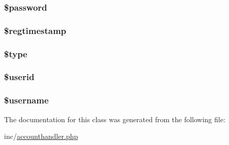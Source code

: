 \hypertarget{class_u_e4_a_m___account_a607686ef9f99ea7c42f4f3dd3dbb2b0d}{
\subsubsection[{\$password}]{\setlength{\rightskip}{0pt plus 5cm}\$password}}\label{class_u_e4_a_m___account_a607686ef9f99ea7c42f4f3dd3dbb2b0d}
\hypertarget{class_u_e4_a_m___account_a0d54b0cb14edcb0bb347eec01a221525}{
\subsubsection[{\$regtimestamp}]{\setlength{\rightskip}{0pt plus 5cm}\$regtimestamp}}\label{class_u_e4_a_m___account_a0d54b0cb14edcb0bb347eec01a221525}
\hypertarget{class_u_e4_a_m___account_a9a4a6fba2208984cabb3afacadf33919}{
\subsubsection[{\$type}]{\setlength{\rightskip}{0pt plus 5cm}\$type}}\label{class_u_e4_a_m___account_a9a4a6fba2208984cabb3afacadf33919}
\hypertarget{class_u_e4_a_m___account_ae3f4f74a2aff9863a4767269a47aea11}{
\subsubsection[{\$userid}]{\setlength{\rightskip}{0pt plus 5cm}\$userid}}\label{class_u_e4_a_m___account_ae3f4f74a2aff9863a4767269a47aea11}
\hypertarget{class_u_e4_a_m___account_a0eb82aa5f81cf845de4b36cd653c42cf}{
\subsubsection[{\$username}]{\setlength{\rightskip}{0pt plus 5cm}\$username}}\label{class_u_e4_a_m___account_a0eb82aa5f81cf845de4b36cd653c42cf}


The documentation for this class was generated from the following file\-:\begin{DoxyCompactItemize}
\item 
inc/\hyperlink{accounthandler_8php}{accounthandler.\-php}\end{DoxyCompactItemize}
